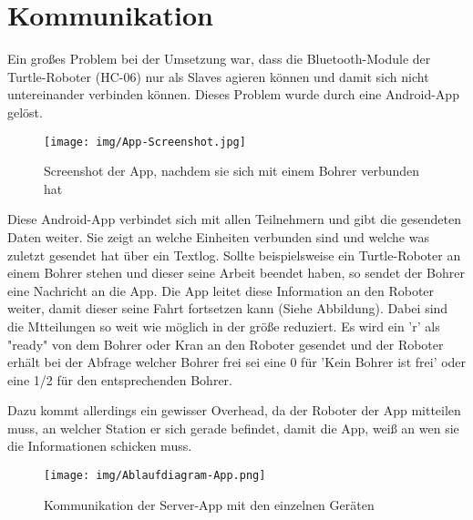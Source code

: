 \section{Kommunikation}
Ein großes Problem bei der Umsetzung war, dass die Bluetooth-Module der Turtle-Roboter (HC-06) nur als Slaves agieren können und damit sich nicht untereinander verbinden können. Dieses Problem wurde durch eine Android-App gelöst.
\begin{figure}[h]
\begin{center}
\texttt{[image: img/App-Screenshot.jpg]}
\caption{Screenshot der App, nachdem sie sich mit einem Bohrer verbunden hat}
\end{center}
\end{figure}

Diese Android-App verbindet sich mit allen Teilnehmern und gibt die gesendeten Daten weiter. Sie zeigt an welche Einheiten verbunden sind und welche was zuletzt gesendet hat über ein Textlog. Sollte beispielsweise ein Turtle-Roboter an einem Bohrer stehen und dieser seine Arbeit beendet haben, so sendet der Bohrer eine Nachricht an die App. Die App leitet diese Information an den Roboter weiter, damit dieser seine Fahrt fortsetzen kann (Siehe Abbildung). Dabei sind die Mtteilungen so weit wie möglich in der größe reduziert. Es wird ein 'r' als "ready" von dem Bohrer oder Kran an den Roboter gesendet und der Roboter erhält bei der Abfrage welcher Bohrer frei sei eine 0 für 'Kein Bohrer ist frei' oder eine 1/2 für den entsprechenden Bohrer.

Dazu kommt allerdings ein gewisser Overhead, da der Roboter der App mitteilen muss, an welcher Station er sich gerade befindet, damit die App, weiß an wen sie die Informationen schicken muss.
\begin{figure}[h]
\begin{center}
\texttt{[image: img/Ablaufdiagram-App.png]}
\caption{Kommunikation der Server-App mit den einzelnen Geräten}
\end{center}
\end{figure}